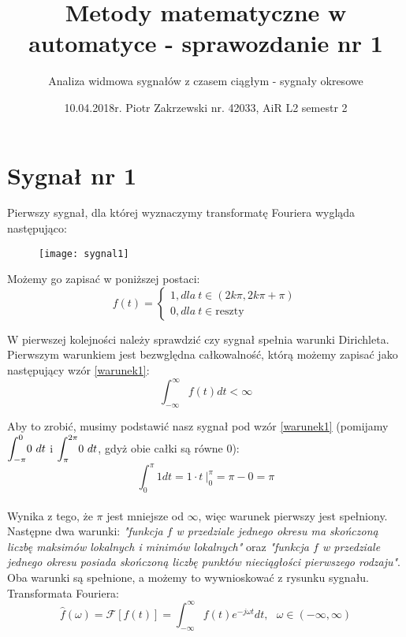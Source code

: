 \documentclass[11pt,a4paper]{article}
\title{Metody matematyczne w automatyce - sprawozdanie nr 1}
\author{Analiza widmowa sygnałów z czasem ciągłym - sygnały okresowe}
\date{10.04.2018r. Piotr Zakrzewski nr. 42033, AiR L2 semestr 2}
\numberwithin{liczba1}{liczba2}
\newcommand\tab[1][1cm]{\hspace*{#1}}
\begin{document}
\maketitle
\section{Sygnał nr 1}

\tab Pierwszy sygnał, dla której wyznaczymy transformatę Fouriera wygląda następująco:
\begin{figure}[h]
\centering
\texttt{[image: sygnal1]}
\end{figure}

Możemy go zapisać w poniższej postaci:
\[
    f(t) =\left\{
                \begin{array}{ll}
                  1, dla\ t \in (2k\pi,2k\pi+\pi) \\
                  0, dla\ t \in \text{reszty}
                \end{array}
\label{sygnal1klamra}
\tag{1.1}
              \right.
\]

W pierwszej kolejności należy sprawdzić czy sygnał spełnia warunki Dirichleta. Pierwszym warunkiem jest bezwględna całkowalność, którą możemy zapisać jako następujący wzór \ref{warunek1}: \\
\begin{equation}
\int_{-\infty}^{\infty} f(t) dt < \infty
\label{warunek1}
\end{equation}
\pagebreak

Aby to zrobić, musimy podstawić nasz sygnał pod wzór \ref{warunek1} (pomijamy $ \mathlarger{\int_{-\pi}^{0}} 0 \ dt $ i $ \mathlarger{\int_{\pi}^{2\pi}} 0 \ dt $, gdyż obie całki są równe 0): \\
\begin{equation}
\int_{0}^{\pi} 1 dt = 1 \cdot t \ \Bigg|^\pi_0 = \pi - 0 = \pi
\end{equation} \\

Wynika z tego, że $ \pi $ jest mniejsze od $ \infty $, więc warunek pierwszy jest spełniony. Następne dwa warunki: \textit{"funkcja $ f $ w przedziale jednego okresu ma skończoną liczbę maksimów lokalnych i minimów lokalnych"} oraz \textit{"funkcja $ f $ w przedziale jednego okresu posiada skończoną liczbę punktów nieciągłości pierwszego rodzaju"}. Oba warunki są spełnione, a możemy to wywnioskować z rysunku sygnału. \\

Transformata Fouriera: \\
\begin{equation}
\hat{f} (\omega) = \mathcal{F}[f(t)] = \int_{-\infty}^{\infty} f(t) e^{-j \omega t} dt, \ \ \ \omega \in (-\infty,\infty)
\label{transformata}
\end{equation}
\end{document}

